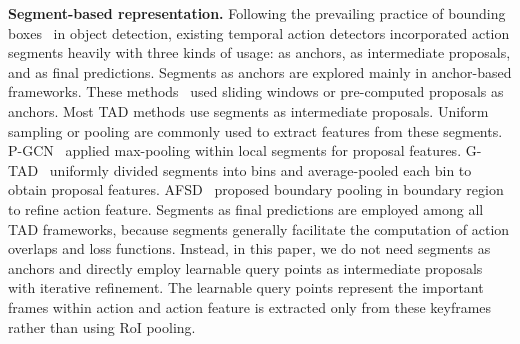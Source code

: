 \documentclass{article}
\renewcommand{\paragraph}[1]{\vspace{1.25mm}\noindent\textbf{#1}}
\begin{document}
\paragraph{Segment-based representation.} 
Following the prevailing practice of bounding boxes~\cite{DBLP:conf/cvpr/LinDGHHB17, DBLP:journals/pami/HeGDG20, DBLP:conf/nips/RenHGS15, DBLP:conf/cvpr/CaiV18} in object detection, existing temporal action detectors incorporated action segments heavily with three kinds of usage: as anchors, as intermediate proposals, and as final predictions. 
Segments as anchors are explored mainly in anchor-based frameworks. These methods~\cite{DBLP:conf/iccv/OneataVS13, DBLP:conf/mir/MettesGCMS15,DBLP:conf/iccv/ZengHGTRZH19, DBLP:conf/cvpr/QingSGW0W0YGS21} used sliding windows or pre-computed proposals as anchors. 
Most TAD methods \cite{DBLP:conf/iccv/ZengHGTRZH19,DBLP:conf/cvpr/Lin0LWTWLHF21,DBLP:conf/cvpr/XuZRTG20,DBLP:conf/cvpr/ChaoVSRDS18,DBLP:journals/ijcv/ZhaoXWWTL20,DBLP:conf/eccv/ZhaoXJZW020} use segments as intermediate proposals. Uniform sampling or pooling are commonly used to extract features from these segments. 
P-GCN~\cite{DBLP:conf/iccv/ZengHGTRZH19} applied max-pooling within local segments for proposal features. G-TAD~\cite{DBLP:conf/cvpr/XuZRTG20} uniformly divided segments into bins and average-pooled each bin to obtain proposal features. 
AFSD~\cite{DBLP:conf/cvpr/Lin0LWTWLHF21} proposed boundary pooling in boundary region to refine action feature.  
Segments as final predictions are employed among all TAD frameworks, because segments generally facilitate the computation of action overlaps and loss functions. 
Instead, in this paper, we do not need segments as anchors and directly employ learnable query points as intermediate proposals with iterative refinement. The learnable query points represent the important frames within action and action feature is extracted only from these keyframes rather than using RoI pooling. 
\end{document}
